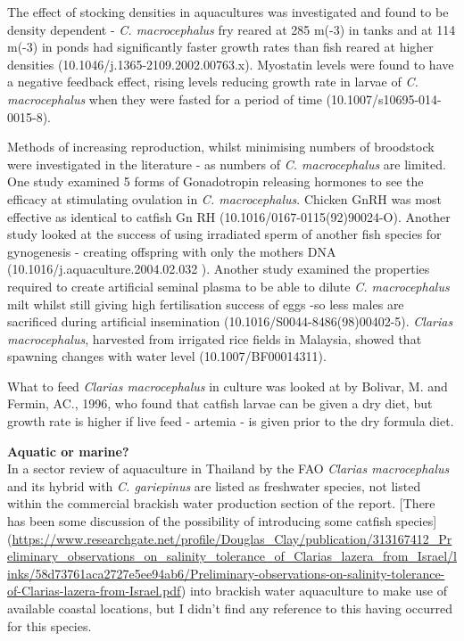 \documentclass[]{book}
\theoremstyle{definition}
\theoremstyle{definition}
\theoremstyle{definition}
\theoremstyle{remark}
\begin{document}
The effect of stocking densities in aquacultures was investigated and
found to be density dependent - \emph{C. macrocephalus} fry reared at
285 m(-3) in tanks and at 114 m(-3) in ponds had significantly faster
growth rates than fish reared at higher densities
(10.1046/j.1365-2109.2002.00763.x). Myostatin levels were found to have
a negative feedback effect, rising levels reducing growth rate in larvae
of \emph{C. macrocephalus} when they were fasted for a period of time
(10.1007/s10695-014-0015-8).

Methods of increasing reproduction, whilst minimising numbers of
broodstock were investigated in the literature - as numbers of \emph{C.
macrocephalus} are limited. One study examined 5 forms of Gonadotropin
releasing hormones to see the efficacy at stimulating ovulation in
\emph{C. macrocephalus}. Chicken GnRH was most effective as identical to
catfish Gn RH (10.1016/0167-0115(92)90024-O). Another study looked at
the success of using irradiated sperm of another fish species for
gynogenesis - creating offspring with only the mothers DNA
(10.1016/j.aquaculture.2004.02.032 ). Another study examined the
properties required to create artificial seminal plasma to be able to
dilute \emph{C. macrocephalus} milt whilst still giving high
fertilisation success of eggs -so less males are sacrificed during
artificial insemination (10.1016/S0044-8486(98)00402-5). \emph{Clarias
macrocephalus}, harvested from irrigated rice fields in Malaysia, showed
that spawning changes with water level (10.1007/BF00014311).

What to feed \emph{Clarias macrocephalus} in culture was looked at by
Bolivar, M. and Fermin, AC., 1996, who found that catfish larvae can be
given a dry diet, but growth rate is higher if live feed - artemia - is
given prior to the dry formula diet.

\textbf{Aquatic or marine?}\\
In a sector review of aquaculture in Thailand by the FAO \emph{Clarias
macrocephalus} and its hybrid with \emph{C. gariepinus} are listed as
freshwater species, not listed within the commercial brackish water
production section of the report. {[}There has been some discussion of
the possibility of introducing some catfish species{]}
(\url{https://www.researchgate.net/profile/Douglas_Clay/publication/313167412_Preliminary_observations_on_salinity_tolerance_of_Clarias_lazera_from_Israel/links/58d73761aca2727e5ee94ab6/Preliminary-observations-on-salinity-tolerance-of-Clarias-lazera-from-Israel.pdf})
into brackish water aquaculture to make use of available coastal
locations, but I didn't find any reference to this having occurred for
this species.
\end{document}
